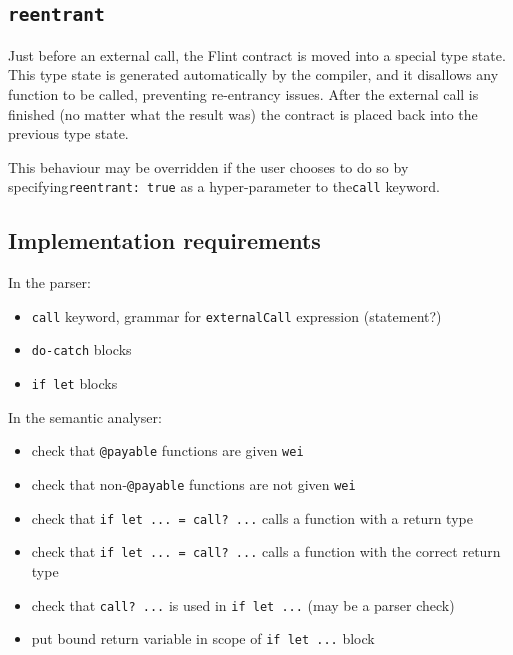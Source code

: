 \subsection{\texttt{reentrant}}

Just before an external call, the Flint contract is moved into a special type state. This type state is generated automatically by the compiler, and it disallows any function to be called, preventing re-entrancy issues. After the external call is finished (no matter what the result was) the contract is placed back into the previous type state.

This behaviour may be overridden if the user chooses to do so by specifying\texttt{reentrant: true} as a hyper-parameter to the\texttt{call} keyword.

\subsection{Implementation requirements}

In the parser:

\begin{itemize}
	\item \texttt{call} keyword, grammar for \texttt{externalCall} expression (statement?)
	\item \texttt{do-catch} blocks
	\item \texttt{if let} blocks
\end{itemize}

In the semantic analyser:

\begin{itemize}
	\item check that \texttt{@payable} functions are given \texttt{wei}
	\item check that non-\texttt{@payable} functions are not given \texttt{wei}
	\item check that \texttt{if let ... = call? ...} calls a function with a return type
	\item check that \texttt{if let ... = call? ...} calls a function with the correct return type
	\item check that \texttt{call? ...} is used in \texttt{if let ...} (may be a parser check)
	\item put bound return variable in scope of \texttt{if let ...} block
\end{itemize}

